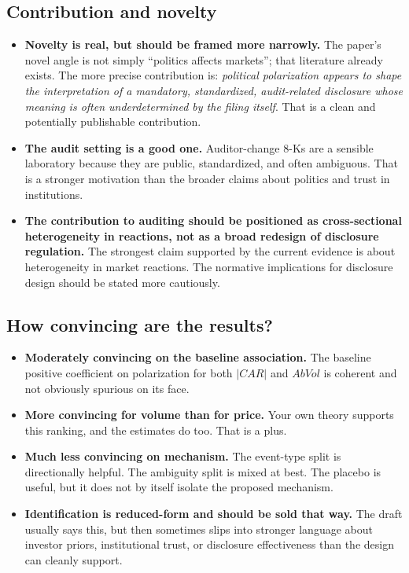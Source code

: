 \documentclass[11pt]{article}
\begin{document}
\subsection*{Contribution and novelty}
\begin{itemize}
    \item \textbf{Novelty is real, but should be framed more narrowly.} The paper's novel angle is not simply ``politics affects markets''; that literature already exists. The more precise contribution is: \emph{political polarization appears to shape the interpretation of a mandatory, standardized, audit-related disclosure whose meaning is often underdetermined by the filing itself}. That is a clean and potentially publishable contribution.
    \item \textbf{The audit setting is a good one.} Auditor-change 8-Ks are a sensible laboratory because they are public, standardized, and often ambiguous. That is a stronger motivation than the broader claims about politics and trust in institutions.
    \item \textbf{The contribution to auditing should be positioned as cross-sectional heterogeneity in reactions, not as a broad redesign of disclosure regulation.} The strongest claim supported by the current evidence is about heterogeneity in market reactions. The normative implications for disclosure design should be stated more cautiously.
\end{itemize}

\subsection*{How convincing are the results?}
\begin{itemize}
    \item \textbf{Moderately convincing on the baseline association.} The baseline positive coefficient on polarization for both $|CAR|$ and $AbVol$ is coherent and not obviously spurious on its face.
    \item \textbf{More convincing for volume than for price.} Your own theory supports this ranking, and the estimates do too. That is a plus.
    \item \textbf{Much less convincing on mechanism.} The event-type split is directionally helpful. The ambiguity split is mixed at best. The placebo is useful, but it does not by itself isolate the proposed mechanism.
    \item \textbf{Identification is reduced-form and should be sold that way.} The draft usually says this, but then sometimes slips into stronger language about investor priors, institutional trust, or disclosure effectiveness than the design can cleanly support.
\end{itemize}
\end{document}
